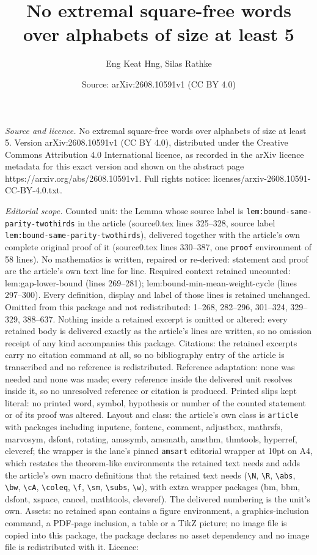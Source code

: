 \documentclass[10pt,a4paper]{amsart}
\title[No extremal square-free words over alphabets of size at leas]{No extremal square-free words over alphabets of size at least 5}
\author{Eng Keat Hng, Silas Rathke}
\date{Source: arXiv:2608.10591v1 (CC BY 4.0)}
\begin{document}
\maketitle

\noindent\emph{Source and licence.} No extremal square-free words over alphabets of size at least 5. Version arXiv:2608.10591v1 (CC BY 4.0), distributed under the Creative Commons Attribution 4.0 International licence, as recorded in the arXiv licence metadata for this exact version and shown on the abstract page https://arxiv.org/abs/2608.10591v1. Full rights notice: licenses/arxiv-2608.10591-CC-BY-4.0.txt.\par\smallskip

\noindent\textit{Editorial scope.} Counted unit: the Lemma whose source label is \texttt{lem:bound-same-parity-twothirds} in the article (source0.tex lines 325--328, source label \texttt{lem:bound-same-parity-twothirds}), delivered together with the article's own complete original proof of it (source0.tex lines 330--387, one \texttt{proof} environment of 58 lines). No mathematics is written, repaired or re-derived: statement and proof are the article's own text line for line. Required context retained uncounted: lem:gap-lower-bound (lines 269--281); lem:bound-min-mean-weight-cycle (lines 297--300). Every definition, display and label of those lines is retained unchanged. Omitted from this package and not redistributed: 1--268, 282--296, 301--324, 329--329, 388--637. Nothing inside a retained excerpt is omitted or altered: every retained body is delivered exactly as the article's lines are written, so no omission receipt of any kind accompanies this package. Citations: the retained excerpts carry no citation command at all, so no bibliography entry of the article is transcribed and no reference is redistributed. Reference adaptation: none was needed and none was made; every reference inside the delivered unit resolves inside it, so no unresolved reference or citation is produced. Printed slips kept literal: no printed word, symbol, hypothesis or number of the counted statement or of its proof was altered. Layout and class: the article's own class is \texttt{article} with packages including inputenc, fontenc, comment, adjustbox, mathrsfs, marvosym, dsfont, rotating, amssymb, amsmath, amsthm, thmtools, hyperref, cleveref; the wrapper is the lane's pinned \texttt{amsart} editorial wrapper at 10pt on A4, which restates the theorem-like environments the retained text needs and adds the article's own macro definitions that the retained text needs (\texttt{\textbackslash N}, \texttt{\textbackslash R}, \texttt{\textbackslash abs}, \texttt{\textbackslash bw}, \texttt{\textbackslash cA}, \texttt{\textbackslash coleq}, \texttt{\textbackslash f}, \texttt{\textbackslash sm}, \texttt{\textbackslash subs}, \texttt{\textbackslash w}), with extra wrapper packages (bm, bbm, dsfont, xspace, cancel, mathtools, cleveref). The delivered numbering is the unit's own. Assets: no retained span contains a figure environment, a graphics-inclusion command, a PDF-page inclusion, a table or a TikZ picture; no image file is copied into this package, the package declares no asset dependency and no image file is redistributed with it. Licence: 
\end{document}
